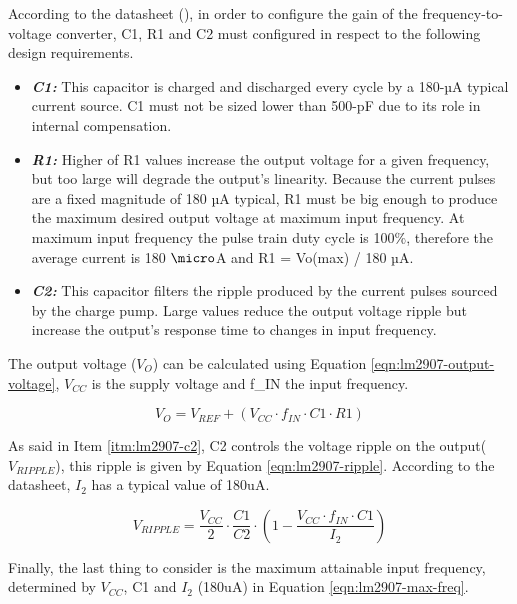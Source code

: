 			According to the datasheet (\cite{lm2907-datasheet}), in order to configure the gain of the frequency-to-voltage converter, C1, R1 and C2 must configured in respect to the following design requirements.

			\begin{itemize}
				\item\textbf{\textit{C1:}} This capacitor is charged and discharged every cycle by a 180-µA typical current source. C1 must not be sized lower than 500-pF due to its role in internal compensation.\label{itm:lm2907-c1}
				\item\textbf{\textit{R1:}} Higher of R1 values increase the output voltage for a given frequency, but too large will degrade the output’s linearity. Because the current pulses are a fixed magnitude of 180 µA typical, R1 must be big enough to produce the maximum desired output voltage at maximum input frequency. At maximum input frequency the pulse train duty cycle is 100$\%$, therefore the average current is 180 $\micro$A and R1 = Vo(max) / 180 µA.\label{itm:lm2907-r1}
				\item\textbf{\textit{C2:}} This capacitor filters the ripple produced by the current pulses sourced by the charge pump. Large values reduce the output voltage ripple but increase the output’s response time to changes in input frequency.\label{itm:lm2907-c2}
			\end{itemize}

			The output voltage ($V_{O}$) can be calculated using Equation \ref{eqn:lm2907-output-voltage}, $V_{CC}$ is the supply voltage and f_{IN} the input frequency.

			\begin{equation}\label{eqn:lm2907-output-voltage}
				V_{O}=V_{REF} + \left( V_{CC} \cdot f_{IN} \cdot C1 \cdot R1 \right)
			\end{equation}

			As said in Item \ref{itm:lm2907-c2}, C2 controls the voltage ripple on the output($V_{RIPPLE}$), this ripple is given by Equation \ref{eqn:lm2907-ripple}. According to the datasheet, $I_{2}$ has a typical value of 180uA.

			\begin{equation}\label{eqn:lm2907-ripple}
				V_{RIPPLE}=\frac{V_{CC}}{2} \cdot \frac{C1}{C2} \cdot \left( 1 - \frac{V_{CC} \cdot f_{IN} \cdot C1}{I_{2}} \right)
			\end{equation}

			Finally, the last thing to consider is the maximum attainable input frequency, determined by $V_{CC}$, C1 and $I_{2}$ (180uA) in Equation \ref{eqn:lm2907-max-freq}.


